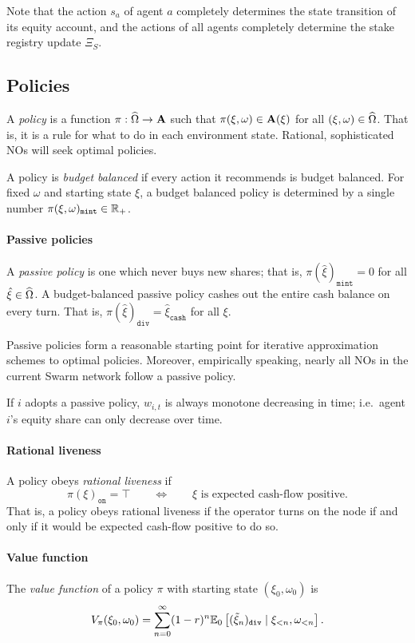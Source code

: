 Note that the action $s_a$ of agent $a$ completely determines the state transition of its equity account, and the actions of all agents completely determine the stake registry update $\Xi_S$.


\subsection{Policies}

A \emph{policy} is a function $\pi:\widehat{\Omega}\rightarrow\mathbf{A}$ such that $\pi(\xi,\omega)\in\mathbf{A}(\xi)$ for all $(\xi,\omega)\in\widehat{\Omega}$.
%
That is, it is a rule for what to do in each environment state.
%
Rational, sophisticated NOs will seek optimal policies.

A policy is \emph{budget balanced} if every action it recommends is budget balanced.
%
For fixed $\omega$ and starting state $\xi$, a budget balanced policy is determined by a single number $\pi(\xi,\omega)_\mathtt{mint}\in\mathbb{R}_+$.

\paragraph{Passive policies}
%
A \emph{passive policy} is one which never buys new shares; that is, $\pi(\hat\xi)_\mathtt{mint}=0$ for all $\hat\xi\in\widehat{\Omega}$.
%
A budget-balanced passive policy cashes out the entire cash balance on every turn. 
%
That is, $\pi(\hat\xi)_\mathtt{div}=\hat\xi_\mathtt{cash}$ for all $\xi$.

Passive policies form a reasonable starting point for iterative approximation schemes to optimal policies.
%
Moreover, empirically speaking, nearly all NOs in the current Swarm network follow a passive policy.

If $i$ adopts a passive policy, $w_{i,t}$ is always monotone decreasing in time; i.e.~agent $i$'s equity share can only decrease over time.

\paragraph{Rational liveness}
%
A policy obeys \emph{rational liveness} if 
\[
  \pi(\xi)_\mathtt{on} = \top \qquad \Leftrightarrow \qquad \xi\text{ is expected cash-flow positive}.
\]
That is, a policy obeys rational liveness if the operator turns on the node if and only if it would be expected cash-flow positive to do so.

\paragraph{Value function}
The \emph{value function} of a policy $\pi$ with starting state $(\xi_0,\omega_0)$ is
\[
  V_\pi(\xi_0,\omega_0) = \sum_{n=0}^\infty (1-r)^n\mathbb{E}_0 \left[ (\tilde{\xi}_n)_\mathtt{div} \mid \xi_{<n}, \omega_{<n}\right].
\]



